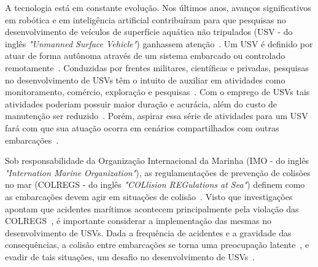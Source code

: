     
    A tecnologia está em constante evolução. Nos últimos anos, avanços significativos em robótica e em inteligência artificial contribuíram para que pesquisas no desenvolvimento de veículos de superfície aquática não tripulados (USV - do inglês \textit{"Unmanned Surface Vehicle"}) ganhassem atenção~\cite{HUANG2020451}. Um USV é definido por atuar de forma autônoma através de um sistema embarcado ou controlado remotamente~\cite{SONG2018351}. Conduzidas por frentes militares, científicas e privadas, pesquisas no desenvolvimento de USVs têm o intuito de auxiliar em atividades como monitoramento, comércio, exploração e pesquisas~\cite{JURAK2020}. Com o emprego de USVs tais atividades poderiam possuir maior duração e acurácia, além do custo de manutenção ser reduzido~\cite{LIU201671}. Porém, aspirar essa série de atividades para um USV fará com que sua atuação ocorra em cenários compartilhados com outras embarcações~\cite{KUWATA2014110}.

    Sob responsabilidade da Organização Internacional da Marinha (IMO - do inglês \textit{"Internation Marine Organization"}), as regulamentações de prevenção de colisões no mar (COLREGS - do inglês \textit{"COLlision REGulations at Sea"}) definem como as embarcações devem agir em situações de colisão~\cite{JURAK2020}. Visto que investigações apontam que acidentes marítimos acontecem principalmente pela violação das COLREGS~\cite{SONG2018351}, é importante considerar a implementação das mesmas no desenvolvimento de USVs. Dada a frequência de acidentes e a gravidade das consequências, a colisão entre embarcações se torna uma preocupação latente~\cite{HUANG2019142}, e evadir de tais situações, um desafio no desenvolvimento de USVs~\cite{JURAK2020}. 

